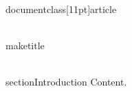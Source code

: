 \\documentclass[11pt]{article}
\begin{document}
\\maketitle

\\section{Introduction}
Content.

\
\end{document}
